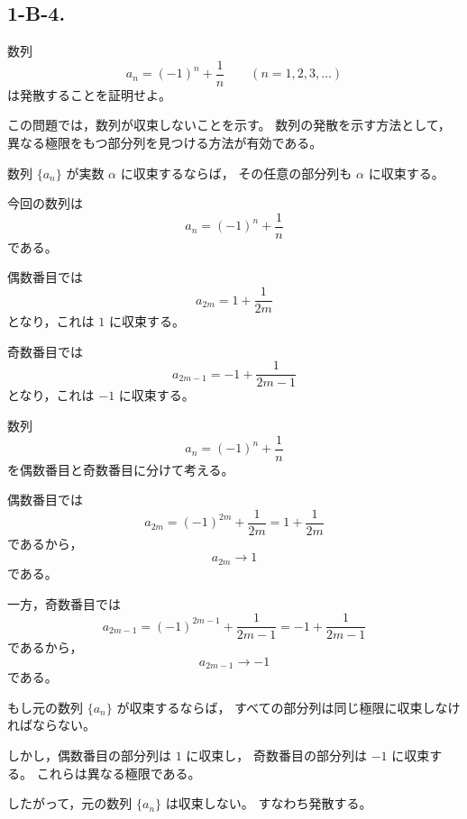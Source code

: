 \subsection{1-B-4.}
\begin{exercise}
	数列
	\[
		a_n=(-1)^n+\frac{1}{n}
		\qquad
		(n=1,2,3,\ldots)
	\]
	は発散することを証明せよ。
\end{exercise}
\begin{background}
	この問題では，数列が収束しないことを示す。
	数列の発散を示す方法として，異なる極限をもつ部分列を見つける方法が有効である。

	\begin{theorem}[収束列の部分列]
		数列 $\{a_n\}$ が実数 $\alpha$ に収束するならば，
		その任意の部分列も $\alpha$ に収束する。
	\end{theorem}

	\begin{remark}
		今回の数列は
		\[
			a_n=(-1)^n+\frac{1}{n}
		\]
		である。

		偶数番目では
		\[
			a_{2m}=1+\frac{1}{2m}
		\]
		となり，これは $1$ に収束する。

		奇数番目では
		\[
			a_{2m-1}=-1+\frac{1}{2m-1}
		\]
		となり，これは $-1$ に収束する。
	\end{remark}
\end{background}
\begin{strategy}
	数列
	\[
		a_n=(-1)^n+\frac{1}{n}
	\]
	を偶数番目と奇数番目に分けて考える。

	偶数番目では
	\[
		a_{2m}=(-1)^{2m}+\frac{1}{2m}
		=
		1+\frac{1}{2m}
	\]
	であるから，
	\[
		a_{2m}\to 1
	\]
	である。

	一方，奇数番目では
	\[
		a_{2m-1}=(-1)^{2m-1}+\frac{1}{2m-1}
		=
		-1+\frac{1}{2m-1}
	\]
	であるから，
	\[
		a_{2m-1}\to -1
	\]
	である。

	もし元の数列 $\{a_n\}$ が収束するならば，
	すべての部分列は同じ極限に収束しなければならない。

	しかし，偶数番目の部分列は $1$ に収束し，
	奇数番目の部分列は $-1$ に収束する。
	これらは異なる極限である。

	したがって，元の数列 $\{a_n\}$ は収束しない。
	すなわち発散する。
\end{strategy}